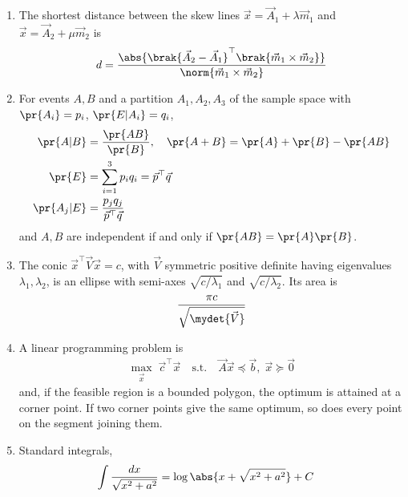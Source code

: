 \begin{enumerate}[label=\thesubsection.\arabic*, ref=\thesubsection.\theenumi]
proof :- $\vec{F}-\vec{Q}$ is orthogonal to $\vec{m}$. From \eqref{eq:EE26BTECH11226-ortho},
\begin{align}
	\vec{m}^{\top}\brak{\vec{P}_0 + \lambda_0\vec{m} - \vec{Q}} = 0
	\implies \lambda_0 = \frac{\vec{m}^{\top}\brak{\vec{Q}-\vec{P}_0}}{\vec{m}^{\top}\vec{m}}
\end{align}
\item The shortest distance between the skew lines $\vec{x} = \vec{A}_1 + \lambda\vec{m}_1$ and $\vec{x} = \vec{A}_2 + \mu\vec{m}_2$ is
\begin{align}
	d = \frac{\abs{\brak{\vec{A}_2-\vec{A}_1}^{\top}\brak{\vec{m}_1\times\vec{m}_2}}}{\norm{\vec{m}_1\times\vec{m}_2}}
	\label{eq:EE26BTECH11226-skew}
\end{align}
\item For events $A, B$ and a partition $A_1, A_2, A_3$ of the sample space with $\pr{A_i}=p_i$, $\pr{E\vert A_i}=q_i$,
\begin{align}
	\pr{A\vert B} &= \frac{\pr{AB}}{\pr{B}}, \quad \pr{A+B} = \pr{A}+\pr{B}-\pr{AB}
	\label{eq:EE26BTECH11226-cond}
	\\
	\pr{E} &= \sum_{i=1}^{3} p_i q_i = \vec{p}^{\top}\vec{q}
	\label{eq:EE26BTECH11226-total}
	\\
	\pr{A_j\vert E} &= \frac{p_j q_j}{\vec{p}^{\top}\vec{q}}
	\label{eq:EE26BTECH11226-bayes}
\end{align}
and $A, B$ are independent if and only if $\pr{AB} = \pr{A}\pr{B}$.
\item The conic $\vec{x}^{\top}\vec{V}\vec{x} = c$, with $\vec{V}$ symmetric positive definite having eigenvalues $\lambda_1, \lambda_2$, is an ellipse with semi-axes $\sqrt{c/\lambda_1}$ and $\sqrt{c/\lambda_2}$. Its area is
\begin{align}
	\frac{\pi c}{\sqrt{\mydet{\vec{V}}}}
	\label{eq:EE26BTECH11226-ellipse}
\end{align}
\item A linear programming problem is
\begin{align}
	\max_{\vec{x}} \; \vec{c}^{\top}\vec{x} \quad \text{s.t.} \quad
	\vec{A}\vec{x} \preceq \vec{b}, \; \vec{x} \succeq \vec{0}
	\label{eq:EE26BTECH11226-lpp}
\end{align}
and, if the feasible region is a bounded polygon, the optimum is attained at a corner point. If two corner points give the same optimum, so does every point on the segment joining them.
\item Standard integrals,
\begin{align}
	\int \frac{dx}{\sqrt{x^2+a^2}} &= \log\abs{x+\sqrt{x^2+a^2}} + C

\end{align}
\end{enumerate}
